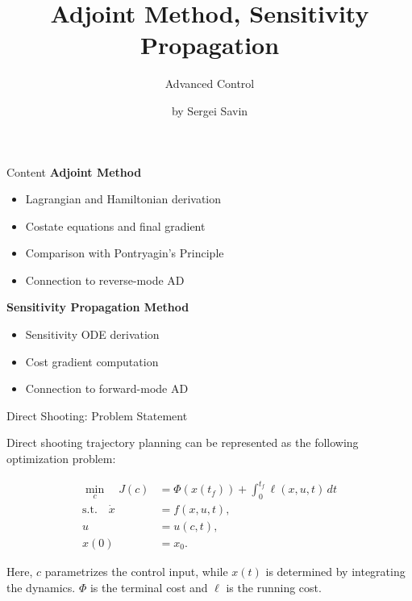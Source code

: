 \documentclass{beamer}
\title{Adjoint Method, Sensitivity Propagation}
\subtitle{Advanced Control}
\author{by Sergei Savin}
\date{\mydate}
\begin{document}
\maketitle


\begin{frame}{Content}
\textbf{Adjoint Method}
\begin{itemize}
	\item Lagrangian and Hamiltonian derivation
	\item Costate equations and final gradient
	\item Comparison with Pontryagin's Principle
	\item Connection to reverse-mode AD
\end{itemize}

\textbf{Sensitivity Propagation Method}
\begin{itemize}
	\item Sensitivity ODE derivation
	\item Cost gradient computation
	\item Connection to forward-mode AD
\end{itemize}
\end{frame}



\begin{frame}{Direct Shooting: Problem Statement}
	\begin{flushleft}
		Direct shooting trajectory planning can be represented as
		the following optimization problem:
		
		\[
		\boxed{
			\begin{aligned}
				\min_{c}\quad
				J(c)&=\Phi(x(t_f))+
				\int_0^{t_f}\ell(x,u,t)\,dt\\
				\text{s.t.}\quad
				\dot{x}&=f(x,u,t),\\
				u&=u(c,t),\\
				x(0)&=x_0.
			\end{aligned}
		}
		\]
		
		\bigskip
		
		Here, $c$ parametrizes the control input, while
		$x(t)$ is determined by integrating the dynamics. $\Phi$ is the terminal cost and $\ell$ is the running cost.
	\end{flushleft}
\end{frame}
\end{document}
